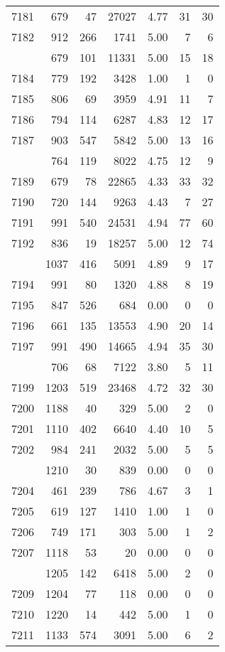 \documentclass[
]{article}
\begin{document}
\begin{table}
\begin{tabular}[t]{lrrrrrr}
7181 & 679 & 47 & 27027 & 4.77 & 31 & 30\\
7182 & 912 & 266 & 1741 & 5.00 & 7 & 6\\
\addlinespace
7183 & 679 & 101 & 11331 & 5.00 & 15 & 18\\
7184 & 779 & 192 & 3428 & 1.00 & 1 & 0\\
7185 & 806 & 69 & 3959 & 4.91 & 11 & 7\\
7186 & 794 & 114 & 6287 & 4.83 & 12 & 17\\
7187 & 903 & 547 & 5842 & 5.00 & 13 & 16\\
\addlinespace
7188 & 764 & 119 & 8022 & 4.75 & 12 & 9\\
7189 & 679 & 78 & 22865 & 4.33 & 33 & 32\\
7190 & 720 & 144 & 9263 & 4.43 & 7 & 27\\
7191 & 991 & 540 & 24531 & 4.94 & 77 & 60\\
7192 & 836 & 19 & 18257 & 5.00 & 12 & 74\\
\addlinespace
7193 & 1037 & 416 & 5091 & 4.89 & 9 & 17\\
7194 & 991 & 80 & 1320 & 4.88 & 8 & 19\\
7195 & 847 & 526 & 684 & 0.00 & 0 & 0\\
7196 & 661 & 135 & 13553 & 4.90 & 20 & 14\\
7197 & 991 & 490 & 14665 & 4.94 & 35 & 30\\
\addlinespace
7198 & 706 & 68 & 7122 & 3.80 & 5 & 11\\
7199 & 1203 & 519 & 23468 & 4.72 & 32 & 30\\
7200 & 1188 & 40 & 329 & 5.00 & 2 & 0\\
7201 & 1110 & 402 & 6640 & 4.40 & 10 & 5\\
7202 & 984 & 241 & 2032 & 5.00 & 5 & 5\\
\addlinespace
7203 & 1210 & 30 & 839 & 0.00 & 0 & 0\\
7204 & 461 & 239 & 786 & 4.67 & 3 & 1\\
7205 & 619 & 127 & 1410 & 1.00 & 1 & 0\\
7206 & 749 & 171 & 303 & 5.00 & 1 & 2\\
7207 & 1118 & 53 & 20 & 0.00 & 0 & 0\\
\addlinespace
7208 & 1205 & 142 & 6418 & 5.00 & 2 & 0\\
7209 & 1204 & 77 & 118 & 0.00 & 0 & 0\\
7210 & 1220 & 14 & 442 & 5.00 & 1 & 0\\
7211 & 1133 & 574 & 3091 & 5.00 & 6 & 2\\

\end{tabular}
\end{table}
\end{document}
